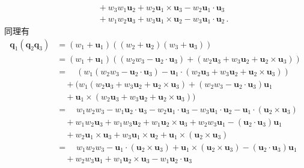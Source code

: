 \begin{prove}
\begin{align}
                                      & \quad +w_3w_1{\bm u}_2+w_2{\bm u}_1\times{\bm u}_3-w_2{\bm u}_1\cdot{\bm u}_3\nonumber                                                              \\
                                      & \quad +w_1w_2{\bm u}_3+w_3{\bm u}_1\times{\bm u}_2-w_3{\bm u}_1\cdot{\bm u}_2\, .
    \end{align}
    同理有
    \begin{align}
        {\bm q}_1({\bm q}_2{\bm q}_3) & =(w_1+{\bm u}_1)((w_2+{\bm u}_2)(w_3+{\bm u}_3))\nonumber                                                                                           \\
                                      & =(w_1+{\bm u}_1)((w_2w_3-{\bm u}_2\cdot{\bm u}_3)+(w_2{\bm u}_3+w_3{\bm u}_2+{\bm u}_2\times{\bm u}_3))\nonumber                                    \\
                                      & =\quad(w_1(w_2w_3-{\bm u}_2\cdot{\bm u}_3)-{\bm u}_1\cdot(w_2{\bm u}_3+w_3{\bm u}_2+{\bm u}_2\times{\bm u}_3))\nonumber                             \\
                                      & \quad +(w_1(w_2{\bm u}_3+w_3{\bm u}_2+{\bm u}_2\times{\bm u}_3)+(w_2w_3-{\bm u}_2\cdot{\bm u}_3){\bm u}_1\nonumber                                  \\
                                      & \quad +{\bm u}_1\times(w_2{\bm u}_3+w_3{\bm u}_2+{\bm u}_2\times{\bm u}_3))\nonumber                                                                \\
                                      & =\quad w_1w_2w_3-w_1{\bm u}_2\cdot{\bm u}_3-w_2{\bm u}_1\cdot{\bm u}_3-w_3{\bm u}_1\cdot{\bm u}_2-{\bm u}_1\cdot({\bm u}_2\times{\bm u}_3)\nonumber \\
                                      & \quad +w_1w_2{\bm u}_3+w_1w_3{\bm u}_2+w_1{\bm u}_2\times{\bm u}_3+w_2w_3{\bm u}_1-({\bm u}_2\cdot{\bm u}_3){\bm u}_1\nonumber                      \\
                                      & \quad +w_2{\bm u}_1\times{\bm u}_3+w_3{\bm u}_1\times{\bm u}_2+{\bm u}_1\times({\bm u}_2\times{\bm u}_3)\nonumber                                   \\
                                      & =\quad w_1w_2w_3-{\bm u}_1\cdot({\bm u}_2\times{\bm u}_3)+{\bm u}_1\times({\bm u}_2\times{\bm u}_3)-({\bm u}_2\cdot{\bm u}_3){\bm u}_1\nonumber     \\
                                      & \quad +w_2w_3{\bm u}_1+w_1{\bm u}_2\times{\bm u}_3-w_1{\bm u}_2\cdot{\bm u}_3\nonumber                                                              \\

\end{align}
\end{prove}
